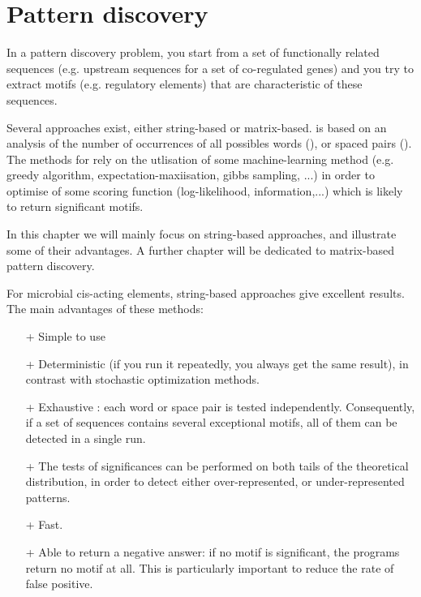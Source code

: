 \chapter{Pattern discovery}

In a pattern discovery problem, you start from a set of functionally
related sequences (e.g.  upstream sequences for a set of co-regulated
genes) and you try to extract motifs (e.g. regulatory elements) that
are characteristic of these sequences.

Several approaches exist, either string-based or
matrix-based.  is based on an
analysis of the number of occurrences of all possibles words
(), or spaced pairs
(). The methods for  rely on the utlisation of some machine-learning
method (e.g. greedy algorithm, expectation-maxiisation, gibbs
sampling, ...) in order to optimise of some scoring function
(log-likelihood, information,...) which is likely to return
significant motifs.

In this chapter we will mainly focus on string-based approaches, and
illustrate some of their advantages. A further chapter will be
dedicated to matrix-based pattern discovery.

For microbial cis-acting elements, string-based approaches give
excellent results. The main advantages of these methods:

\begin{itemize}
\item[+] Simple to use
\item[+] Deterministic (if you run it repeatedly, you always get the
  same result), in contrast with stochastic optimization methods.
\item[+] Exhaustive : each word or space pair is tested
  independently. Consequently, if a set of sequences contains several
  exceptional motifs, all of them can be detected in a single run. 
\item[+] The tests of significances can be performed on both tails of
  the theoretical distribution, in order to detect either
  over-represented, or under-represented patterns.
\item[+] Fast. 
\item[+] Able to return a negative answer: if no motif is significant,
  the programs return no motif at all. This is particularly important
  to reduce the rate of false positive.
\end{itemize}


